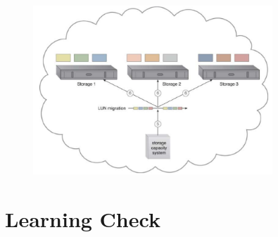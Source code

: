     \begin{figure}[htb!]
    \centering
    \includegraphics[width=9cm]{./Images/cap12/12.13.png}
\end{figure}

\clearpage
\section{Learning Check}
